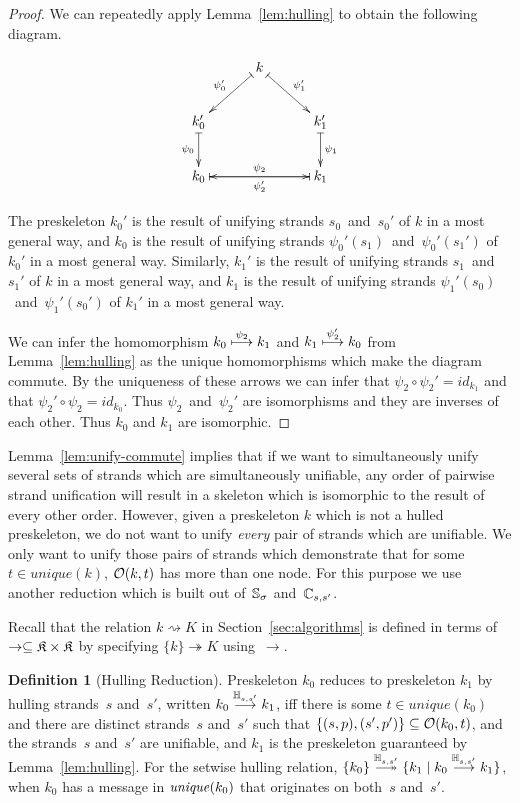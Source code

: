 \documentclass[12pt]{article}
\theoremstyle{definition}
\newtheorem{defn}{Definition}[section]
\begin{document}
\begin{proof}
We can repeatedly apply Lemma~\ref{lem:hulling} to obtain the
following diagram.

$$
\xymatrix@C=3em{
& k\ar@{|->}[ld]_{\psi_0'}
	 \ar@{|->}[rd]^{\psi_1'} &\\
k_0'\ar@{|->}[d]_{\psi_0} %
& &
k_1'\ar@{|->}[d]^{\psi_1} %
\\
k_0\ar@{|->}[rr]^{\psi_2} & & k_1\ar@{|->}[ll]^{\psi_2'}
}$$

The preskeleton $k_0'$ is the result of unifying strands $s_0$~and~$s_0'$
of $k$ in a most general way, and $k_0$ is the result of unifying
strands $\psi_0'(s_1)$~and~$\psi_0'(s_1')$ of $k_0'$ in a most general
way.  Similarly, $k_1'$ is the result of unifying strands $s_1$~and~$s_1'$
of $k$ in a most general way, and $k_1$ is the result of unifying
strands $\psi_1'(s_0)$~and~$\psi_1'(s_0')$ of $k_1'$ in a most general way.

We can infer the homomorphism $k_0\stackrel{\psi_2}{\longmapsto}k_1$ and
$k_1\stackrel{\psi_2'}{\longmapsto}k_0$ from Lemma~\ref{lem:hulling}
as the unique homomorphisms which make the diagram commute.  By the
uniqueness of these arrows we can infer that $\psi_2\circ\psi_2'=id_{k_1}$
and that $\psi_2'\circ\psi_2=id_{k_0}$.  Thus $\psi_2$~and~$\psi_2'$ are
isomorphisms and they are inverses of each other.  Thus $k_0$ and $k_1$
are isomorphic.
\end{proof}

Lemma~\ref{lem:unify-commute} implies that if we want to simultaneously
unify several sets of strands which are simultaneously unifiable,
any order of pairwise strand unification
will result in a skeleton which is isomorphic to the result of every
other order.  However, given a preskeleton $k$ which is not a hulled
preskeleton, we do not want to unify \emph{every} pair of strands
which are unifiable.  We only want to unify those pairs of strands
which demonstrate that for some $t\in unique(k)$, $\mathcal{O}(k,t)$ has
more than one node.  For this purpose we use another reduction
which is built out of~$\mathbb S_{\sigma}$ and~$\mathbb C_{s,s'}$.

Recall that the relation $k\rightsquigarrow K$ in
Section~\ref{sec:algorithms} is defined in terms of
$\to\subseteq\mathfrak K\times\mathfrak K$ by specifying
$\{k\}\twoheadrightarrow K$ using~$\to$.

\begin{defn}[Hulling Reduction]\label{def:hulling}
Preskeleton $k_0$ reduces to preskeleton $k_1$ by hulling strands~$s$
and~$s'$, written $k_0\stackrel{\mathbb H_{s,s'}}{\longrightarrow}k_1$, iff there is
some $t\in unique(k_0)$ and there are distinct strands~$s$ and~$s'$
such that $\{(s,p),(s',p')\}\subseteq\mathcal{O}(k_0,t)$, and the
strands~$s$ and~$s'$ are unifiable, and $k_1$ is the preskeleton
guaranteed by Lemma~\ref{lem:hulling}.  For the setwise hulling
relation, $\{k_0\}\setreduction{\ops{H}_{s,s'}}\{k_1\mid
k_0\reduction{\ops{H}_{s,s'}}k_1\}$, when $k_0$ has a message in
$\operatorname{\mathit{unique}}(k_0)$ that originates on both~$s$ and~$s'$.
\end{defn}
\end{document}
